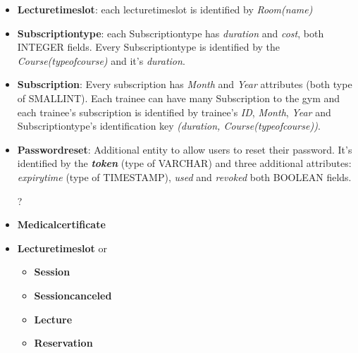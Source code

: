 \begin{itemize}
    	\item \textbf{Lecture\textunderscore time\textunderscore slot}: each lecture\textunderscore time\textunderscore slot is identified by \textit{Room(name)}
    	
    	\item \textbf{Subscription\textunderscore type}: each Subscription\textunderscore type has \textit{duration} and \textit{cost}, both INTEGER fields. Every Subscription\textunderscore type is identified by the \textit{Course(type\textunderscore of\textunderscore course)} and it's \textit{duration}.
    	
    	\item \textbf{Subscription}: Every subscription has \textit{Month} and \textit{Year} attributes (both type of SMALLINT). Each trainee can have many Subscription to the gym and each trainee's subscription is identified by trainee's \textit{ID}, \textit{Month}, \textit{Year} and Subscription\textunderscore type's identification key \textit{(duration, Course(type\textunderscore of\textunderscore course))}.
    	
    	\item \textbf{Password\textunderscore reset}: Additional entity to allow users to reset their password. It's identified by the \textbf{\textit{token}} (type of VARCHAR) and three additional attributes: \textit{expiry\textunderscore time} (type of TIMESTAMP), \textit{used} and \textit{revoked} both BOOLEAN fields.
        
        	
    	\color{red}
    	\item[?]
    	\item \textbf{Medical\textunderscore certificate}
    	
    	\item \textbf{Lecture\textunderscore time\textunderscore slot} or
		\begin{itemize}
    	    \item \textbf{Session}
		    \item \textbf{Session\textunderscore canceled}
		    \item \textbf{Lecture}
		    \item \textbf{Reservation}
    	\end{itemize}
		\color{black}
	
    \end{itemize}